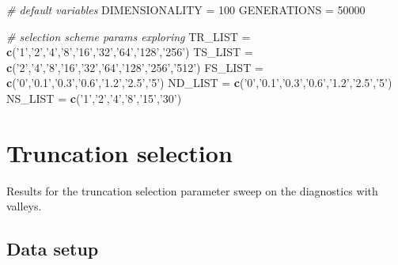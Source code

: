 \documentclass[]{book}
\newenvironment{Shaded}{\begin{snugshade}}{\end{snugshade}}
\newcommand{\CommentTok}[1]{\textcolor[rgb]{0.56,0.35,0.01}{\textit{#1}}}
\newcommand{\DecValTok}[1]{\textcolor[rgb]{0.00,0.00,0.81}{#1}}
\newcommand{\KeywordTok}[1]{\textcolor[rgb]{0.13,0.29,0.53}{\textbf{#1}}}
\newcommand{\NormalTok}[1]{#1}
\newcommand{\StringTok}[1]{\textcolor[rgb]{0.31,0.60,0.02}{#1}}
\begin{document}
\begin{Shaded}
\begin{Highlighting}[]
\CommentTok{# default variables}
\NormalTok{DIMENSIONALITY =}\StringTok{ }\DecValTok{100}
\NormalTok{GENERATIONS =}\StringTok{ }\DecValTok{50000}

\CommentTok{# selection scheme params exploring}
\NormalTok{TR_LIST =}\StringTok{ }\KeywordTok{c}\NormalTok{(}\StringTok{'1'}\NormalTok{,}\StringTok{'2'}\NormalTok{,}\StringTok{'4'}\NormalTok{,}\StringTok{'8'}\NormalTok{,}\StringTok{'16'}\NormalTok{,}\StringTok{'32'}\NormalTok{,}\StringTok{'64'}\NormalTok{,}\StringTok{'128'}\NormalTok{,}\StringTok{'256'}\NormalTok{)}
\NormalTok{TS_LIST =}\StringTok{ }\KeywordTok{c}\NormalTok{(}\StringTok{'2'}\NormalTok{,}\StringTok{'4'}\NormalTok{,}\StringTok{'8'}\NormalTok{,}\StringTok{'16'}\NormalTok{,}\StringTok{'32'}\NormalTok{,}\StringTok{'64'}\NormalTok{,}\StringTok{'128'}\NormalTok{,}\StringTok{'256'}\NormalTok{,}\StringTok{'512'}\NormalTok{)}
\NormalTok{FS_LIST =}\StringTok{ }\KeywordTok{c}\NormalTok{(}\StringTok{'0'}\NormalTok{,}\StringTok{'0.1'}\NormalTok{,}\StringTok{'0.3'}\NormalTok{,}\StringTok{'0.6'}\NormalTok{,}\StringTok{'1.2'}\NormalTok{,}\StringTok{'2.5'}\NormalTok{,}\StringTok{'5'}\NormalTok{)}
\NormalTok{ND_LIST =}\StringTok{ }\KeywordTok{c}\NormalTok{(}\StringTok{'0'}\NormalTok{,}\StringTok{'0.1'}\NormalTok{,}\StringTok{'0.3'}\NormalTok{,}\StringTok{'0.6'}\NormalTok{,}\StringTok{'1.2'}\NormalTok{,}\StringTok{'2.5'}\NormalTok{,}\StringTok{'5'}\NormalTok{)}
\NormalTok{NS_LIST =}\StringTok{ }\KeywordTok{c}\NormalTok{(}\StringTok{'1'}\NormalTok{,}\StringTok{'2'}\NormalTok{,}\StringTok{'4'}\NormalTok{,}\StringTok{'8'}\NormalTok{,}\StringTok{'15'}\NormalTok{,}\StringTok{'30'}\NormalTok{)}
\end{Highlighting}
\end{Shaded}

\hypertarget{truncation-selection}{%
\chapter{Truncation selection}\label{truncation-selection}}

Results for the truncation selection parameter sweep on the diagnostics with valleys.

\hypertarget{data-setup}{%
\section{Data setup}\label{data-setup}}
\end{document}
